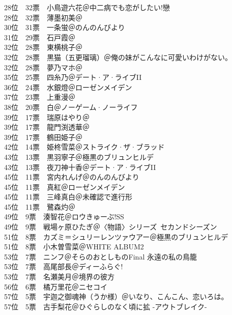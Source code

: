 {    28位　32票　小鳥遊六花＠中二病でも恋がしたい!戀\\
    28位　32票　薄墨初美＠\Saki\\
    30位　31票　一条蛍＠のんのんびより\\
    31位　29票　石戸霞＠\Saki\\
    32位　28票　東横桃子＠\Saki\\
    32位　28票　黒猫（五更瑠璃）＠俺の妹がこんなに可愛いわけがない。\\
    32位　28票　夢乃マホ＠\Saki\\
    35位　25票　四糸乃＠デート·ア·ライブII\\
    36位　24票　水銀燈＠ローゼンメイデン\\
    37位　23票　上重漫＠\Saki\\
    38位　20票　白＠ノーゲーム·ノーライフ\\
    39位　17票　瑞原はやり＠\Saki\\
    39位　17票　龍門渕透華＠\Saki\\
    39位　17票　鶴田姫子＠\Saki\\
    42位　14票　姫柊雪菜＠ストライク·ザ·ブラッド\\
    43位　13票　黒羽寧子＠極黒のブリュンヒルデ\\
    43位　13票　夜刀神十香＠デート·ア·ライブII\\
    45位　11票　宮内れんげ＠のんのんびより\\
    45位　11票　真紅＠ローゼンメイデン\\
    45位　11票　三峰真白＠未確認で進行形\\
    45位　11票　鷺森灼＠\Saki\\
    49位　9票　湊智花＠ロウきゅーぶ!SS\\
    49位　9票　戦場ヶ原ひたぎ＠〈物語〉シリーズ~セカンドシーズン\\
    51位　8票　カズミ＝シュリーレンツァウアー＠極黒のブリュンヒルデ\\
    51位　8票　小木曽雪菜＠WHITE ALBUM2\\
    53位　7票　ニンフ＠そらのおとしものFinal 永遠の私の鳥籠\\
    53位　7票　高尾部長＠ディーふらぐ!\\
    53位　7票　名瀬美月＠境界の彼方\\
    56位　6票　橘万里花＠ニセコイ\\
    57位　5票　宇迦之御魂神（うか様）＠いなり、こんこん、恋いろは。\\
    57位　5票　古手梨花＠ひぐらしのなく頃に拡 -アウトブレイク-\\
}
